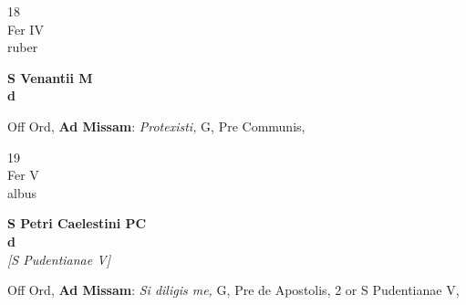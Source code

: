 \documentclass[10pt, openany]{book}
\begin{document}
        \begin{center}
            \begin{minipage}{3.5in}
                \vspace{2em}
                \begin{minipage}{0.5in}
                    {\Huge 18} \\
                    {\normalsize Fer IV} \\
                    {\normalsize ruber}
                \end{minipage}
                \begin{minipage}{3.0in}
                    \textbf{ \large S Venantii M \\
                    \textnormal{\normalsize d}} \\ 
                \end{minipage}
                \begin{justify}Off Ord, \textbf{Ad Missam}: \textit{Protexisti,} G, Pre Communis,  
                \end{justify}
            \end{minipage}
        \end{center}
    
        \begin{center}
            \begin{minipage}{3.5in}
                \vspace{2em}
                \begin{minipage}{0.5in}
                    {\Huge 19} \\
                    {\normalsize Fer V} \\
                    {\normalsize albus}
                \end{minipage}
                \begin{minipage}{3.0in}
                    \textbf{ \large S Petri Caelestini PC \\
                    \textnormal{\normalsize d}} \\ \textit{[S Pudentianae V]} \\ 
                \end{minipage}
                \begin{justify}Off Ord, \textbf{Ad Missam}: \textit{Si diligis me,} G, Pre de Apostolis, 2 or S Pudentianae V,  
                \end{justify}
            \end{minipage}
        \end{center}
    
\end{document}
